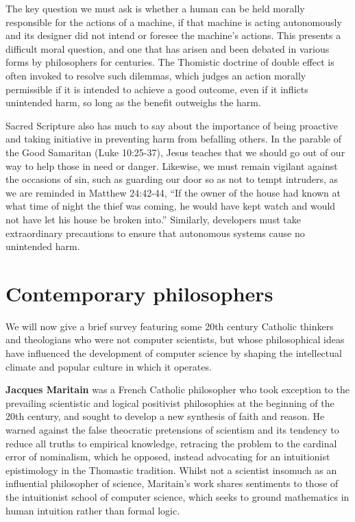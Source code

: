 \documentclass[sigplan,nonacm]{acmart}\settopmatter{printfolios=false,printccs=false,printacmref=false}
\begin{document}
  The key question we must ask is whether a human can be held morally responsible for the actions of a machine, if that machine is acting autonomously and its designer did not intend or foresee the machine's actions. This presents a difficult moral question, and one that has arisen and been debated in various forms by philosophers for centuries. The Thomistic doctrine of double effect is often invoked to resolve such dilemmas, which judges an action morally permissible if it is intended to achieve a good outcome, even if it inflicts unintended harm, so long as the benefit outweighs the harm.

  Sacred Scripture also has much to say about the importance of being proactive and taking initiative in preventing harm from befalling others. In the parable of the Good Samaritan (Luke 10:25-37), Jesus teaches that we should go out of our way to help those in need or danger. Likewise, we must remain vigilant against the occasions of sin, such as guarding our door so as not to tempt intruders, as we are reminded in Matthew 24:42-44, ``If the owner of the house had known at what time of night the thief was coming, he would have kept watch and would not have let his house be broken into.'' Similarly, developers must take extraordinary precautions to ensure that autonomous systems cause no unintended harm.


  \section{Contemporary philosophers}

  We will now give a brief survey featuring some 20th century Catholic thinkers and theologians who were not computer scientists, but whose philosophical ideas have influenced the development of computer science by shaping the intellectual climate and popular culture in which it operates.

  \textbf{Jacques Maritain} was a French Catholic philosopher who took exception to the prevailing scientistic and logical positivist philosophies at the beginning of the 20th century, and sought to develop a new synthesis of faith and reason. He warned against the false theocratic pretensions of scientism and its tendency to reduce all truths to empirical knowledge, retracing the problem to the cardinal error of nominalism, which he opposed, instead advocating for an intuitionist epistimology in the Thomastic tradition. Whilst not a scientist insomuch as an influential philosopher of science, Maritain's work shares sentiments to those of the intuitionist school of computer science, which seeks to ground mathematics in human intuition rather than formal logic.
\end{document}
